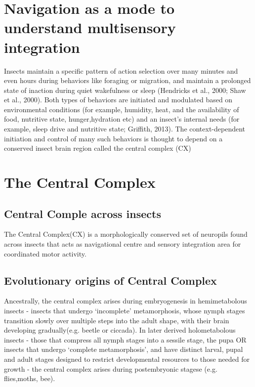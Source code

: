\section{Navigation as a mode to understand multisensory integration}

        Insects maintain a specific pattern of action selection over many minutes and even hours during behaviors like foraging or migration, and maintain a prolonged state of inaction during quiet wakefulness or sleep (Hendricks et al., 2000; Shaw et al., 2000). Both types of behaviors are initiated and modulated based on environmental conditions (for example, humidity, heat, and the availability of food, nutritive state, hunger,hydration etc) and an insect’s internal needs (for example, sleep drive and nutritive state; Griffith, 2013). The context-dependent initiation and control of many such behaviors is thought to depend on a conserved insect brain region called the central complex (CX) %


\section{The Central Complex}

    \subsection{Central Comple across insects}
        The Central Complex(CX) is a morphologically conserved set of neuropils found across insects
        that acts as navigational centre and sensory integration area for coordinated motor activity.

    \subsection{Evolutionary origins of Central Complex}
        Ancestrally, the central complex arises during embryogenesis in hemimetabolous insects - insects that undergo ‘incomplete’ metamorphosis, whose nymph stages transition slowly over multiple steps into the adult shape, with their brain developing gradually(e.g. beetle or ciccada).
        In later derived holometabolous insects -  those that compress all nymph stages into a sessile stage, the pupa OR insects that undergo ‘complete metamorphosis’, and have distinct larval, pupal and adult stages designed to restrict developmental resources to those needed for growth - the central complex arises during  postembryonic stagese (e.g. flies,moths, bee).

